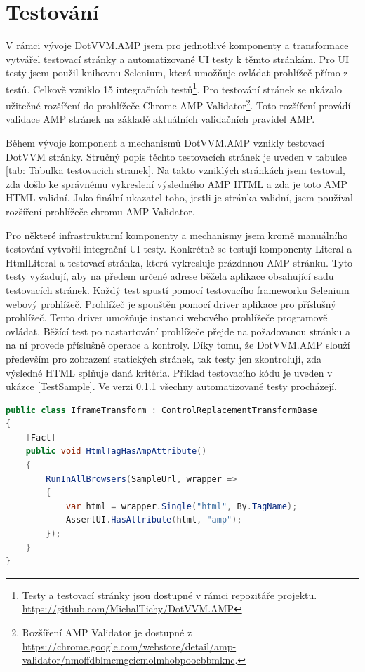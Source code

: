 \section{Testování}
V rámci vývoje DotVVM.AMP jsem pro jednotlivé komponenty a transformace vytvářel testovací stránky a automatizované UI testy k těmto stránkám. Pro UI testy jsem použil knihovnu Selenium, která umožňuje ovládat prohlížeč přímo z testů. Celkově vzniklo 15 integračních testů\footnote{Testy a testovací stránky jsou dostupné v rámci repozitáře projektu.\newline
\url{https://github.com/MichalTichy/DotVVM.AMP}}. Pro testování stránek se ukázalo užitečné rozšíření do prohlížeče Chrome AMP Validator\footnote{\label{AmpValidatorFoot} Rozšíření AMP Validator je dostupné z \url{https://chrome.google.com/webstore/detail/amp-validator/nmoffdblmcmgeicmolmhobpoocbbmknc}.}. Toto rozšíření provádí validace AMP stránek na základě aktuálních validačních pravidel AMP.

Během vývoje komponent a mechanismů DotVVM.AMP vznikly testovací DotVVM stránky. Stručný popis těchto testovacích stránek je uveden v tabulce \ref{tab: Tabulka testovacich stranek}. Na takto vzniklých stránkách jsem testoval, zda došlo ke správnému vykreslení výsledného AMP HTML a zda je toto AMP HTML validní. Jako finální ukazatel toho, jestli je stránka validní, jsem používal rozšíření prohlížeče chromu AMP Validator.

Pro některé infrastrukturní komponenty a mechanismy jsem kromě manuálního testování vytvořil integrační UI testy. Konkrétně se testují komponenty Literal a HtmlLiteral a testovací stránka, která vykresluje prázdnnou AMP stránku. Tyto testy vyžadují, aby na předem určené adrese běžela aplikace obsahující sadu testovacích stránek. Každý test spustí pomocí testovacího frameworku Selenium webový prohlížeč. Prohlížeč je spouštěn pomocí driver aplikace pro příslušný prohlížeč. Tento driver umožňuje instanci webového prohlížeče programově ovládat. Běžící test po nastartování prohlížeče přejde na požadovanou stránku a na ní provede příslušné operace a kontroly. Díky tomu, že DotVVM.AMP slouží především pro zobrazení statických stránek, tak testy jen zkontrolují, zda výsledné HTML splňuje daná kritéria. Příklad testovacího kódu je uveden v  ukázce \ref{TestSample}. Ve verzi 0.1.1 všechny automatizované testy procházejí.

\begin{lstlisting}[language=c#, caption=Ukázka testovacího kódu.,label=TestSample,captionpos=t]
public class IframeTransform : ControlReplacementTransformBase
{
    [Fact]
    public void HtmlTagHasAmpAttribute()
    {
        RunInAllBrowsers(SampleUrl, wrapper =>
        {
            var html = wrapper.Single("html", By.TagName);
            AssertUI.HasAttribute(html, "amp");
        });
    }
}
\end{lstlisting}

